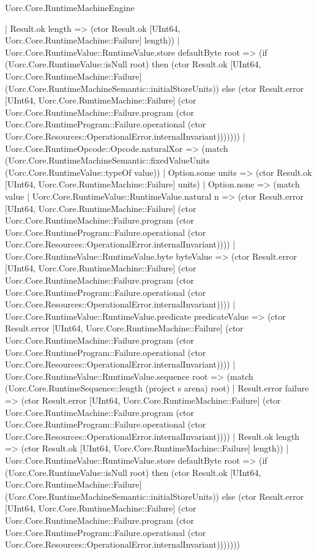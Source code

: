 \begin{lexlean}{Uorc.Core.RuntimeMachineEngine}
\begin{semanticmodule}
{                | Result.ok length => (ctor Result.ok [UInt64, Uorc.Core.RuntimeMachine::Failure] length))
              | Uorc.Core.RuntimeValue::RuntimeValue.store defaultByte root => (if (Uorc.Core.RuntimeValue::isNull root) then (ctor Result.ok [UInt64, Uorc.Core.RuntimeMachine::Failure] (Uorc.Core.RuntimeMachineSemantic::initialStoreUnits)) else (ctor Result.error [UInt64, Uorc.Core.RuntimeMachine::Failure] (ctor Uorc.Core.RuntimeMachine::Failure.program (ctor Uorc.Core.RuntimeProgram::Failure.operational (ctor Uorc.Core.Resources::OperationalError.internalInvariant)))))))
          | Uorc.Core.RuntimeOpcode::Opcode.naturalXor => (match (Uorc.Core.RuntimeMachineSemantic::fixedValueUnits (Uorc.Core.RuntimeValue::typeOf value))
            | Option.some units => (ctor Result.ok [UInt64, Uorc.Core.RuntimeMachine::Failure] units)
            | Option.none => (match value
              | Uorc.Core.RuntimeValue::RuntimeValue.natural n => (ctor Result.error [UInt64, Uorc.Core.RuntimeMachine::Failure] (ctor Uorc.Core.RuntimeMachine::Failure.program (ctor Uorc.Core.RuntimeProgram::Failure.operational (ctor Uorc.Core.Resources::OperationalError.internalInvariant))))
              | Uorc.Core.RuntimeValue::RuntimeValue.byte byteValue => (ctor Result.error [UInt64, Uorc.Core.RuntimeMachine::Failure] (ctor Uorc.Core.RuntimeMachine::Failure.program (ctor Uorc.Core.RuntimeProgram::Failure.operational (ctor Uorc.Core.Resources::OperationalError.internalInvariant))))
              | Uorc.Core.RuntimeValue::RuntimeValue.predicate predicateValue => (ctor Result.error [UInt64, Uorc.Core.RuntimeMachine::Failure] (ctor Uorc.Core.RuntimeMachine::Failure.program (ctor Uorc.Core.RuntimeProgram::Failure.operational (ctor Uorc.Core.Resources::OperationalError.internalInvariant))))
              | Uorc.Core.RuntimeValue::RuntimeValue.sequence root => (match (Uorc.Core.RuntimeSequence::length (project s arena) root)
                | Result.error failure => (ctor Result.error [UInt64, Uorc.Core.RuntimeMachine::Failure] (ctor Uorc.Core.RuntimeMachine::Failure.program (ctor Uorc.Core.RuntimeProgram::Failure.operational (ctor Uorc.Core.Resources::OperationalError.internalInvariant))))
                | Result.ok length => (ctor Result.ok [UInt64, Uorc.Core.RuntimeMachine::Failure] length))
              | Uorc.Core.RuntimeValue::RuntimeValue.store defaultByte root => (if (Uorc.Core.RuntimeValue::isNull root) then (ctor Result.ok [UInt64, Uorc.Core.RuntimeMachine::Failure] (Uorc.Core.RuntimeMachineSemantic::initialStoreUnits)) else (ctor Result.error [UInt64, Uorc.Core.RuntimeMachine::Failure] (ctor Uorc.Core.RuntimeMachine::Failure.program (ctor Uorc.Core.RuntimeProgram::Failure.operational (ctor Uorc.Core.Resources::OperationalError.internalInvariant)))))))
}
\end{semanticmodule}
\end{lexlean}

